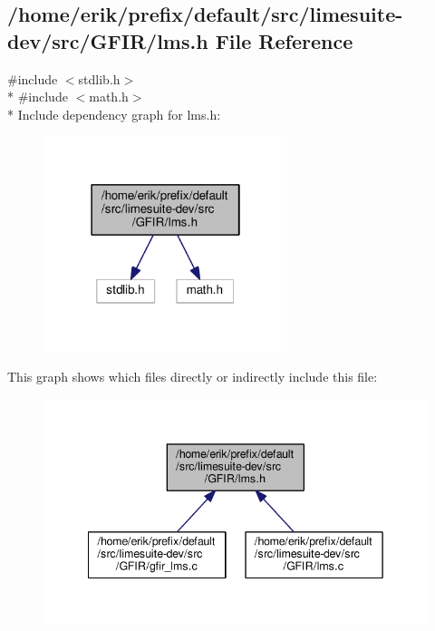 \subsection{/home/erik/prefix/default/src/limesuite-\/dev/src/\+G\+F\+I\+R/lms.h File Reference}
\label{lms_8h}
{\ttfamily \#include $<$stdlib.\+h$>$}\\*
{\ttfamily \#include $<$math.\+h$>$}\\*
Include dependency graph for lms.\+h\+:
\nopagebreak
\begin{figure}[H]
\begin{center}
\leavevmode
\includegraphics[width=202pt]{d0/df4/lms_8h__incl}
\end{center}
\end{figure}
This graph shows which files directly or indirectly include this file\+:
\nopagebreak
\begin{figure}[H]
\begin{center}
\leavevmode
\includegraphics[width=342pt]{d3/d37/lms_8h__dep__incl}
\end{center}
\end{figure}
